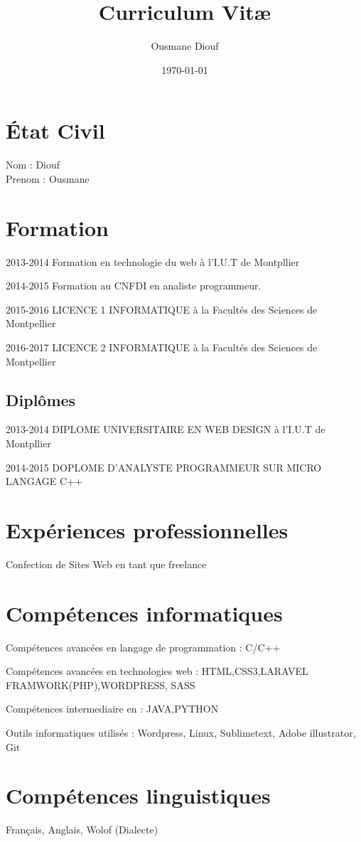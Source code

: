 \documentclass[a4paper]{article}
\title{Curriculum Vit\ae}
\author{Ousmane Diouf}
\date{\today}
\begin{document}
\maketitle

\section*{\'Etat Civil}
\noindent
Nom    : Diouf\\
Prenom : Ousmane 

\section*{Formation}

2013-2014 Formation en technologie du web à l'I.U.T  de Montpllier
 
2014-2015 Formation au CNFDI en analiste programmeur.
 
2015-2016 LICENCE 1 INFORMATIQUE à la Facultés des Sciences de Montpellier 

2016-2017 LICENCE 2 INFORMATIQUE à la Facultés des Sciences de Montpellier


\subsection*{Diplômes}

2013-2014 DIPLOME UNIVERSITAIRE EN WEB DESIGN à l'I.U.T  de Montpllier
 
2014-2015 DOPLOME D'ANALYSTE PROGRAMMEUR SUR MICRO LANGAGE C++
 

\section*{Expériences professionnelles}

Confection de Sites Web en tant que freelance

\section*{Compétences informatiques}

Compétences avancées en langage de programmation : C/C++

Compétences avancées en technologies web : HTML,CSS3,LARAVEL FRAMWORK(PHP),WORDPRESS, SASS

Compétences intermediaire en : JAVA,PYTHON

Outils informatiques utilisés : Wordpress, Linux, Sublimetext, Adobe illustrator, Git 

\section*{Compétences linguistiques}

Français, Anglais, Wolof (Dialecte)
\end{document}
